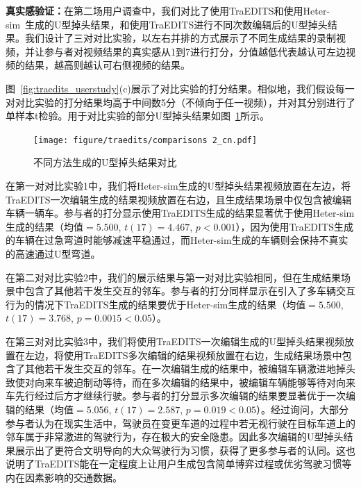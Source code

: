 \textbf{真实感验证：}在第二场用户调查中，我们对比了使用TraEDITS和使用Heter-sim~\cite{ren2019heter}生成的U型掉头结果，和使用TraEDITS进行不同次数编辑后的U型掉头结果。我们设计了三对对比实验，以左右并排的方式展示了不同生成结果的录制视频，并让参与者对视频结果的真实感从1到7进行打分，分值越低代表越认可左边视频的结果，越高则越认可右侧视频的结果。


图~\ref{fig:traedits_userstudy}(c)展示了对比实验的打分结果。相似地，我们假设每一对对比实验的打分结果均高于中间数5分（不倾向于任一视频），并对其分别进行了单样本t检验。用于对比实验的部分U型掉头结果如图~\ref{fig:traedits_comparison}所示。

\begin{figure}[!tbh]
    \centering
    \texttt{[image: figure/traedits/comparisons 2\_cn.pdf]}
    \caption[不同方法生成的U型掉头结果对比]{
    不同方法生成的U型掉头结果对比
    }
    \label{fig:traedits_comparison}
\end{figure}


在第一对对比实验1中，我们将Heter-sim生成的U型掉头结果视频放置在左边，将TraEDITS一次编辑生成的结果视频放置在右边，且生成结果场景中仅包含被编辑车辆一辆车。参与者的打分显示使用TraEDITS生成的结果显著优于使用Heter-sim生成的结果（均值$=5.500$, $t(17)=4.467$, $p<0.001$），因为使用TraEDITS生成的车辆在过急弯道时能够减速平稳通过，而Heter-sim生成的车辆则会保持不真实的高速通过U型弯道。

在第二对对比实验2中，我们的展示结果与第一对对比实验相同，但在生成结果场景中包含了其他若干发生交互的邻车。参与者的打分同样显示在引入了多车辆交互行为的情况下TraEDITS生成的结果要优于Heter-sim生成的结果（均值$=5.500$, $t(17)=3.768$, $p=0.0015<0.05$）。

在第三对对比实验3中，我们将使用TraEDITS一次编辑生成的U型掉头结果视频放置在左边，将使用TraEDITS多次编辑的结果视频放置在右边，生成结果场景中包含了其他若干发生交互的邻车。在一次编辑生成的结果中，被编辑车辆激进地掉头致使对向来车被迫制动等待，而在多次编辑的结果中，被编辑车辆能够等待对向来车先行经过后方才继续行驶。参与者的打分显示多次编辑的结果要显著优于一次编辑的结果（均值$=5.056$, $t(17)=2.587$, $p=0.019<0.05$）。经过询问，大部分参与者认为在现实生活中，驾驶员在变更车道的过程中若无视行驶在目标车道上的邻车属于非常激进的驾驶行为，存在极大的安全隐患。因此多次编辑的U型掉头结果展示出了更符合文明导向的大众驾驶行为习惯，获得了更多参与者的认同。这也说明了TraEDITS能在一定程度上让用户生成包含简单博弈过程或优劣驾驶习惯等内在因素影响的交通数据。


